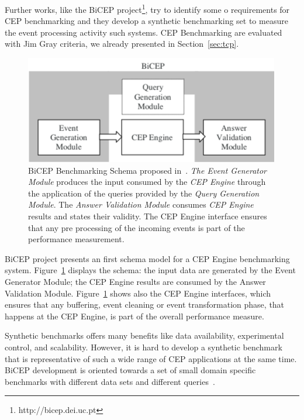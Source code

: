 Further works, like the BiCEP project\footnote{http://bicep.dei.uc.pt}, try to identify some o requirements for CEP benchmarking and they develop a synthetic benchmarking set to measure the event processing activity such systems. CEP Benchmarking are evaluated with Jim Gray criteria, we already presented in Section~\ref{sec:tcp}. 

\begin{figure}[tbh]
  \centering
	\includegraphics[width=\linewidth]{images/bicep_schema}
	\caption[BiCEP Benchmarking Schema]{BiCEP Benchmarking Schema proposed in~\cite{bizarro:DSP:2007:1143}. \textit{The Event Generator Module} produces the input consumed by the \textit{CEP Engine} through the application of the queries provided by the \textit{Query Generation Module}. The \textit{Answer Validation Module} consumes \textit{CEP Engine} results and states their validity. The CEP Engine interface ensures that any pre processing of the incoming events is part of the performance measurement.} 
  	\label{fig:bicep-schema}
\end{figure}

BiCEP project presents an first schema model for a CEP Engine benchmarking system. Figure~\ref{fig:bicep-schema} displays the schema: the input data are generated by the Event Generator Module; the CEP Engine results are consumed by the Answer Validation Module. Figure~\ref{fig:bicep-schema} shows also the CEP Engine interfaces, which ensures that any buffering, event cleaning or event transformation phase, that happens at the CEP Engine, is part of the overall performance measure. 

Synthetic benchmarks offers many benefits like data availability, experimental control, and scalability. However, it is hard to develop a synthetic benchmark that is representative of such a wide range of CEP applications at the same time. BiCEP development is oriented towards a set of small domain specific benchmarks with different data sets and different queries~\cite{bizarro:DSP:2007:1143}.

